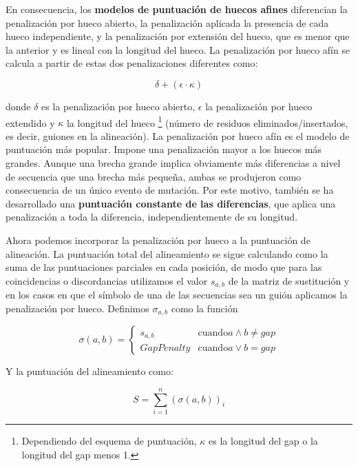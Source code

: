 En consecuencia, los \textbf{modelos de puntuación de huecos afines} diferencian la penalización por hueco abierto, la penalización aplicada la presencia de cada hueco independiente, y la penalización por extensión del hueco, que es menor que la anterior y es lineal con la longitud del hueco. La penalización por hueco afín se calcula a partir de estas dos penalizaciones diferentes como:

$$\delta + (\epsilon \cdot \kappa)$$

donde $\delta$ es la penalización por hueco abierto, $\epsilon$ la penalización por hueco extendido y $\kappa$ la longitud del hueco \footnote{Dependiendo del esquema de puntuación, $\kappa$ es la longitud del gap o la longitud del gap menos 1.} (número de residuos eliminados/insertados, es decir, guiones en la alineación). La penalización por hueco afín es el modelo de puntuación más popular. Impone una penalización mayor a los huecos más grandes. Aunque una brecha grande implica obviamente más diferencias a nivel de secuencia que una brecha más pequeña, ambas se produjeron como consecuencia de un único evento de mutación. Por este motivo, también se ha desarrollado una \textbf{puntuación constante de las diferencias}, que aplica una penalización a toda la diferencia, independientemente de su longitud.

Ahora podemos incorporar la penalización por hueco a la puntuación de alineación. La puntuación total del alineamiento se sigue calculando como la suma de las puntuaciones parciales en cada posición, de modo que para las coincidencias o discordancias utilizamos el valor $s_{a,b}$ de la matriz de sustitución y en los casos en que el símbolo de una de las secuencias sea un guión aplicamos la penalización por hueco. Definimos $\sigma_{a,b}$ como la función

$$\sigma (a, b) = \begin{cases}
s_{a,b} & \text{cuando} a \wedge b \neq gap \\
GapPenalty & \text{cuando} a \vee b = gap
\end{cases} $$

Y la puntuación del alineamiento como:

$$S = \sum_{i = 1}^{n} (\sigma(a,b))_i$$

